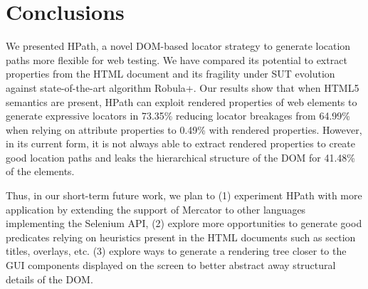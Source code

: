 \section{Conclusions}

We presented HPath, a novel DOM-based locator strategy to generate location paths more flexible for web testing. We have compared its potential to extract properties from the HTML document and its fragility under SUT evolution against state-of-the-art algorithm Robula+. Our results show that when HTML5 semantics are present, HPath can exploit rendered properties of web elements to generate expressive locators in 73.35\% reducing locator breakages from 64.99\% when relying on attribute properties to 0.49\% with rendered properties. However, in its current form, it is not always able to extract rendered properties to create good location paths and  leaks the hierarchical structure of the DOM for 41.48\% of the elements.

Thus, in our short-term future work, we plan to (1) experiment HPath with more application by extending the support of Mercator to other languages implementing the Selenium API, (2) explore more opportunities to generate good predicates relying on heuristics present in the HTML documents such as section titles, overlays, etc. (3) explore ways to generate a rendering tree closer to the GUI components displayed on the screen to better abstract away structural details of the DOM.